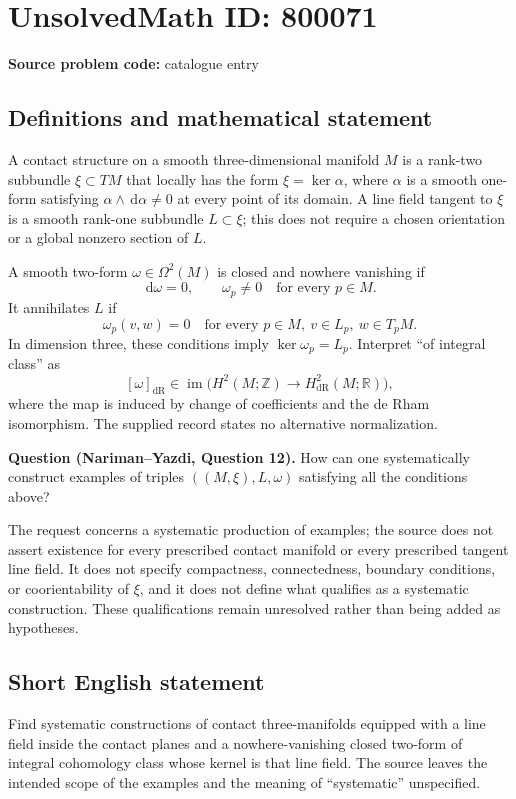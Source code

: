 \documentclass[11pt]{article}
\newcommand{\Z}{\mathbb{Z}}
\newcommand{\R}{\mathbb{R}}
\newcommand{\dd}{\,\mathrm{d}}
\begin{document}
\section*{UnsolvedMath ID: 800071}
\textbf{Source problem code:} catalogue entry
\subsection{Definitions and mathematical statement}
A contact structure on a smooth three-dimensional manifold \(M\) is a rank-two subbundle \(\xi\subset TM\) that locally has the form \(\xi=\ker\alpha\), where \(\alpha\) is a smooth one-form satisfying \(\alpha\wedge\dd\alpha\neq 0\) at every point of its domain. A line field tangent to \(\xi\) is a smooth rank-one subbundle \(L\subset\xi\); this does not require a chosen orientation or a global nonzero section of \(L\).

A smooth two-form \(\omega\in\Omega^2(M)\) is closed and nowhere vanishing if
\[
\dd\omega=0,\qquad \omega_p\neq 0\quad\text{for every }p\in M.
\]
It annihilates \(L\) if
\[
\omega_p(v,w)=0\quad\text{for every }p\in M,\ v\in L_p,\ w\in T_pM.
\]
In dimension three, these conditions imply \(\ker\omega_p=L_p\). Interpret ``of integral class'' as
\[
[\omega]_{\mathrm{dR}}\in\operatorname{im}\bigl(H^2(M;\Z)\longrightarrow H^2_{\mathrm{dR}}(M;\R)\bigr),
\]
where the map is induced by change of coefficients and the de Rham isomorphism. The supplied record states no alternative normalization.

\textbf{Question (Nariman--Yazdi, Question 12).} How can one systematically construct examples of triples \(((M,\xi),L,\omega)\) satisfying all the conditions above?

The request concerns a systematic production of examples; the source does not assert existence for every prescribed contact manifold or every prescribed tangent line field. It does not specify compactness, connectedness, boundary conditions, or coorientability of \(\xi\), and it does not define what qualifies as a systematic construction. These qualifications remain unresolved rather than being added as hypotheses.
\subsection{Short English statement}
Find systematic constructions of contact three-manifolds equipped with a line field inside the contact planes and a nowhere-vanishing closed two-form of integral cohomology class whose kernel is that line field. The source leaves the intended scope of the examples and the meaning of ``systematic'' unspecified.
\end{document}
